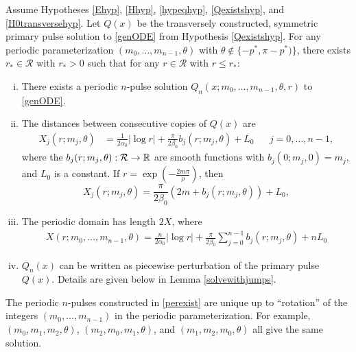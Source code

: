 \documentclass[thesis.tex]{subfiles}
\begin{document}
\begin{theorem}\label{perexist}
Assume Hypotheses \ref{Ehyp}, \ref{Hhyp}, \ref{hypeqhyp}, \ref{Qexistshyp}, and \ref{H0transversehyp}. Let $Q(x)$ be the transversely constructed, symmetric primary pulse solution to \eqref{genODE} from Hypothesis \ref{Qexistshyp}. For any periodic parameterization $(m_0, \dots, m_{n-1}, \theta)$ with $\theta \notin \{-p^*, \pi - p^*) \}$, there exists $r_* \in \mathcal{R}$ with $r_* > 0$ such that for any $r \in \mathcal{R}$ with $r \leq r_*$:
\begin{enumerate}[(i)]
	\item There exists a periodic $n$-pulse solution $Q_n(x; m_0, \dots, m_{n-1}, \theta, r)$ to \eqref{genODE}.

	\item The distances between consecutive copies of $Q(x)$ are
	\begin{align}\label{Xj}
		X_j(r; m_j, \theta) &= \frac{1}{2 \alpha_0} |\log r| + \frac{\pi}{2\beta_0} b_j(r; m_j, \theta) + L_0 && j = 0, \dots, n-1,
	\end{align}
	where the $b_j(r; m_j, \theta): \mathcal{R} \rightarrow \mathbb{R}$ are smooth functions with $b_j(0; m_j, 0) = m_j$, and $L_0$ is a constant. If $r = \exp\left(-\frac{2 m \pi}{\rho}\right)$, then
	\begin{equation}\label{Xjr}
		X_j(r; m_j, \theta) = \frac{\pi}{2\beta_0}\left( 2m + b_j(r; m_j, \theta) \right) + L_0,
	\end{equation}	

	\item The periodic domain has length $2X$, where
	\begin{align}\label{Xdomain}
	X(r; m_0, \dots, m_{n-1}, \theta) = \frac{n}{2\alpha_0} |\log r| + \frac{\pi}{2\beta_0} \sum_{j=0}^{n-1} b_j(r; m_j, \theta) + n L_0
	\end{align}

	\item $Q_n(x)$ can be written as piecewise perturbation of the primary pulse $Q(x)$. Details are given below in Lemma \ref{solvewithjumps}.
\end{enumerate}
\end{theorem}

\begin{remark}
The periodic $n$-pulses constructed in \cref{perexist} are unique up to ``rotation'' of the integers $(m_0, \dots, m_{n-1})$ in the periodic parameterization. For example, $(m_0, m_1, m_2, \theta)$, $(m_2, m_0, m_1, \theta)$, and $(m_1, m_2, m_0, \theta)$ all give the same solution.
\end{remark}
\end{document}
